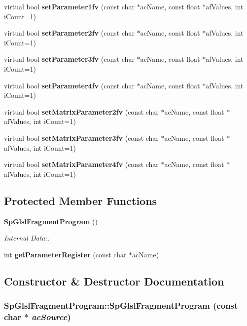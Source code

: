 \begin{CompactItemize}
\item 
virtual bool {\bf set\-Parameter1fv} (const char $\ast$ac\-Name, const float $\ast$af\-Values, int i\-Count=1)
\item 
virtual bool {\bf set\-Parameter2fv} (const char $\ast$ac\-Name, const float $\ast$af\-Values, int i\-Count=1)
\item 
virtual bool {\bf set\-Parameter3fv} (const char $\ast$ac\-Name, const float $\ast$af\-Values, int i\-Count=1)
\item 
virtual bool {\bf set\-Parameter4fv} (const char $\ast$ac\-Name, const float $\ast$af\-Values, int i\-Count=1)
\item 
virtual bool {\bf set\-Matrix\-Parameter2fv} (const char $\ast$ac\-Name, const float $\ast$af\-Values, int i\-Count=1)
\item 
virtual bool {\bf set\-Matrix\-Parameter3fv} (const char $\ast$ac\-Name, const float $\ast$af\-Values, int i\-Count=1)
\item 
virtual bool {\bf set\-Matrix\-Parameter4fv} (const char $\ast$ac\-Name, const float $\ast$af\-Values, int i\-Count=1)
\end{CompactItemize}
\subsection*{Protected Member Functions}
\begin{CompactItemize}
\item 
{\bf Sp\-Glsl\-Fragment\-Program} ()
\begin{CompactList}\small\item\em Internal Data:. \item\end{CompactList}\item 
int {\bf get\-Parameter\-Register} (const char $\ast$ac\-Name)
\end{CompactItemize}


\subsection{Constructor \& Destructor Documentation}
\subsubsection{\setlength{\rightskip}{0pt plus 5cm}Sp\-Glsl\-Fragment\-Program::Sp\-Glsl\-Fragment\-Program (const char $\ast$ {\em ac\-Source})}\label{classSpark_1_1SpGlslFragmentProgram_a0}



